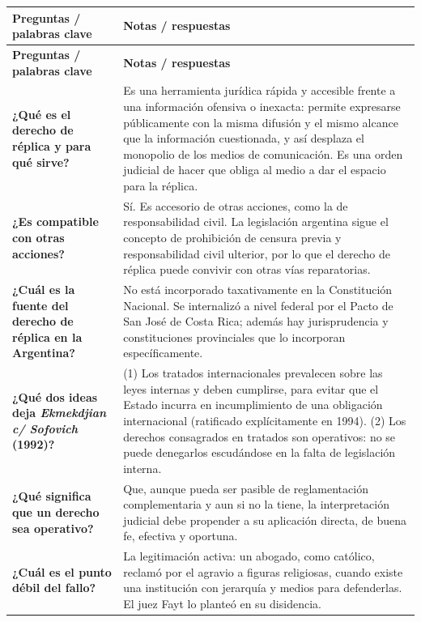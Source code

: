 \documentclass[12pt,oneside]{book}
\newlength{\cornellL}
\newlength{\cornellR}
\begin{document}
\begin{longtable}{|>{\raggedright\arraybackslash}p{\cornellL}|>{\raggedright\arraybackslash}p{\cornellR}|}
\hline
\textbf{Preguntas / palabras clave} & \textbf{Notas / respuestas} \\
\hline
\endfirsthead
\hline
\textbf{Preguntas / palabras clave} & \textbf{Notas / respuestas} \\
\hline
\endhead

\textbf{¿Qué es el derecho de réplica y para qué sirve?} &
Es una herramienta jurídica rápida y accesible frente a una información ofensiva o inexacta: permite expresarse públicamente con la misma difusión y el mismo alcance que la información cuestionada, y así desplaza el monopolio de los medios de comunicación. Es una orden judicial de hacer que obliga al medio a dar el espacio para la réplica. \\
\hline

\textbf{¿Es compatible con otras acciones?} &
Sí. Es accesorio de otras acciones, como la de responsabilidad civil. La legislación argentina sigue el concepto de prohibición de censura previa y responsabilidad civil ulterior, por lo que el derecho de réplica puede convivir con otras vías reparatorias. \\
\hline

\textbf{¿Cuál es la fuente del derecho de réplica en la Argentina?} &
No está incorporado taxativamente en la Constitución Nacional. Se internalizó a nivel federal por el Pacto de San José de Costa Rica; además hay jurisprudencia y constituciones provinciales que lo incorporan específicamente. \\
\hline

\textbf{¿Qué dos ideas deja \textit{Ekmekdjian c/ Sofovich} (1992)?} &
(1) Los tratados internacionales prevalecen sobre las leyes internas y deben cumplirse, para evitar que el Estado incurra en incumplimiento de una obligación internacional (ratificado explícitamente en 1994). (2) Los derechos consagrados en tratados son operativos: no se puede denegarlos escudándose en la falta de legislación interna. \\
\hline

\textbf{¿Qué significa que un derecho sea operativo?} &
Que, aunque pueda ser pasible de reglamentación complementaria y aun si no la tiene, la interpretación judicial debe propender a su aplicación directa, de buena fe, efectiva y oportuna. \\
\hline

\textbf{¿Cuál es el punto débil del fallo?} &
La legitimación activa: un abogado, como católico, reclamó por el agravio a figuras religiosas, cuando existe una institución con jerarquía y medios para defenderlas. El juez Fayt lo planteó en su disidencia. \\
\hline


\end{longtable}
\end{document}
